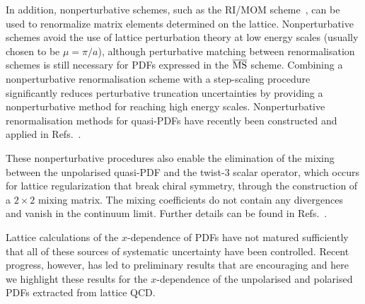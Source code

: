 \begin{itemize}
In addition, nonperturbative schemes, such as the 
RI/MOM scheme~\cite{Martinelli:1994ty}, 
can be used to renormalize matrix elements determined on the lattice. 
%
Nonperturbative schemes avoid the use of lattice perturbation theory at 
low energy scales (usually chosen to be $\mu = \pi/a$), although perturbative 
matching between renormalisation schemes is still necessary for PDFs expressed 
in the $\overline{\rm MS}$ scheme. 
%
Combining a nonperturbative renormalisation scheme with a step-scaling 
procedure~\cite{Luscher:1991wu} significantly reduces perturbative truncation 
uncertainties by providing a nonperturbative method for reaching high energy 
scales.
% 
Nonperturbative renormalisation methods for quasi-PDFs have recently been 
constructed and applied in 
Refs.~\cite{Alexandrou:2017huk,Chen:2017mzz,Green:2017xeu}.

These nonperturbative procedures also enable the elimination of the mixing 
between the unpolarised quasi-PDF and the twist-3 scalar operator, which occurs 
for lattice regularization that break chiral symmetry, through the construction 
of a $2\times2$ mixing matrix. 
%
The mixing coefficients do not contain any divergences and vanish in the 
continuum limit. 
%
Further details can be found in
Refs.~\cite{Alexandrou:2017huk,Chen:2017mzz}. 
\end{itemize}


Lattice calculations of the $x$-dependence of PDFs have not matured sufficiently that all of these sources of systematic uncertainty have been controlled. Recent progress, however, has led to preliminary results that are encouraging and here we highlight these results for the $x$-dependence
of the unpolarised and polarised PDFs extracted from lattice QCD. 


